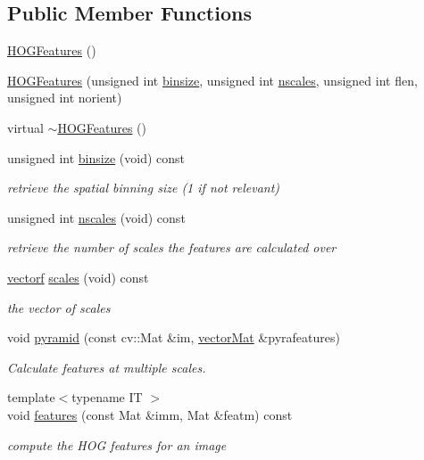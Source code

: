 \subsection*{Public Member Functions}
\begin{DoxyCompactItemize}
\item 
\hyperlink{classHOGFeatures_a323944dc2065bfb4d7b83bac6ea0ba69}{H\-O\-G\-Features} ()
\item 
\hyperlink{classHOGFeatures_a0a423cc8897fa7fa7ce0a4f9679035cf}{H\-O\-G\-Features} (unsigned int \hyperlink{classHOGFeatures_ab4511627f2000a34350d558d6f14425d}{binsize}, unsigned int \hyperlink{classHOGFeatures_a071022517cf2e11c33fa07088f35c228}{nscales}, unsigned int flen, unsigned int norient)
\item 
virtual \hyperlink{classHOGFeatures_a062d1cfbb82dbd2829e844a937490509}{$\sim$\-H\-O\-G\-Features} ()
\item 
unsigned int \hyperlink{classHOGFeatures_ab4511627f2000a34350d558d6f14425d}{binsize} (void) const 
\begin{DoxyCompactList}\small\item\em retrieve the spatial binning size (1 if not relevant) \end{DoxyCompactList}\item 
unsigned int \hyperlink{classHOGFeatures_a071022517cf2e11c33fa07088f35c228}{nscales} (void) const 
\begin{DoxyCompactList}\small\item\em retrieve the number of scales the features are calculated over \end{DoxyCompactList}\item 
\hyperlink{types_8hpp_a4da5db3ee9e284f719ef5764dbadffc8}{vectorf} \hyperlink{classHOGFeatures_ad9668fda860881c676e1d1bd70adc18c}{scales} (void) const 
\begin{DoxyCompactList}\small\item\em the vector of scales \end{DoxyCompactList}\item 
void \hyperlink{classHOGFeatures_a509372c4e652c3fc97f2d2be75fecd4d}{pyramid} (const cv\-::\-Mat \&im, \hyperlink{types_8hpp_a3207a7addcfa415d1c83622febcb1e9b}{vector\-Mat} \&pyrafeatures)
\begin{DoxyCompactList}\small\item\em Calculate features at multiple scales. \end{DoxyCompactList}\item 
{\footnotesize template$<$typename I\-T $>$ }\\void \hyperlink{classHOGFeatures_a0cabf74792b44e23e3dfd2c388b12036}{features} (const Mat \&imm, Mat \&featm) const 
\begin{DoxyCompactList}\small\item\em compute the H\-O\-G features for an image \end{DoxyCompactList}\end{DoxyCompactItemize}
